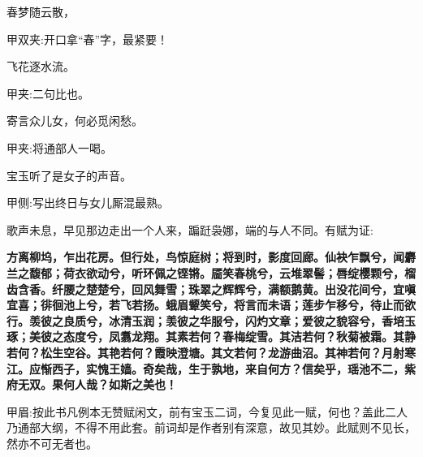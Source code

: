 \begin{poem}
    \begin{pl}春梦随云散，\end{pl}
    \begin{note}甲双夹:开口拿“春”字，最紧要！\end{note}

    \begin{pl}飞花逐水流。\end{pl}\begin{note}甲夹:二句比也。\end{note}

    \begin{pl}寄言众儿女，何必觅闲愁。\end{pl}
    \begin{note}甲夹:将通部人一喝。\end{note}
\end{poem}


\begin{parag}
    宝玉听了是女子的声音。\begin{note}甲侧:写出终日与女儿厮混最熟。\end{note}歌声未息，早见那边走出一个人来，蹁跹袅娜，端的与人不同。有赋为证:
\end{parag}


\begin{qute2sp}
    \textbf{
        方离柳坞，乍出花房。但行处，鸟惊庭树；将到时，影度回廊。仙袂乍飘兮，闻麝兰之馥郁；荷衣欲动兮，听环佩之铿锵。靥笑春桃兮，云堆翠髻；唇绽樱颗兮，榴齿含香。纤腰之楚楚兮，回风舞雪；珠翠之辉辉兮，满额鹅黄。出没花间兮，宜嗔宜喜；徘徊池上兮，若飞若扬。蛾眉颦笑兮，将言而未语；莲步乍移兮，待止而欲行。羡彼之良质兮，冰清玉润；羡彼之华服兮，闪灼文章；爱彼之貌容兮，香培玉琢；美彼之态度兮，凤翥龙翔。其素若何？春梅绽雪。其洁若何？秋菊被霜。其静若何？松生空谷。其艳若何？霞映澄塘。其文若何？龙游曲沼。其神若何？月射寒江。应惭西子，实愧王嫱。奇矣哉，生于孰地，来自何方？信矣乎，瑶池不二，紫府无双。果何人哉？如斯之美也！}
    \begin{note}甲眉:按此书凡例本无赞赋闲文，前有宝玉二词，今复见此一赋，何也？盖此二人乃通部大纲，不得不用此套。前词却是作者别有深意，故见其妙。此赋则不见长，然亦不可无者也。\end{note}

\end{qute2sp}



